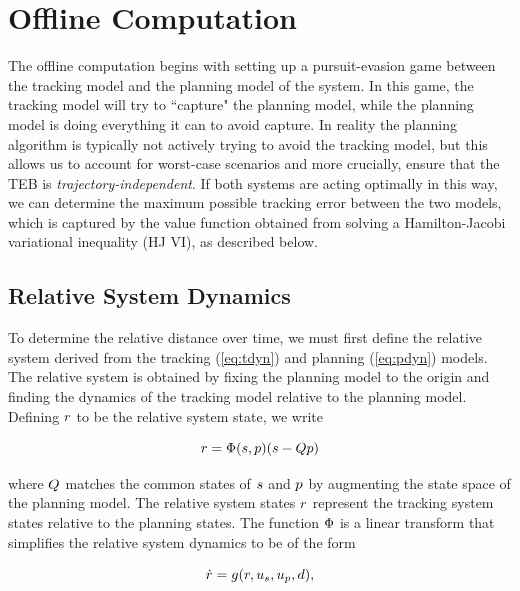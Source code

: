 \section{Offline Computation \label{sec:precomp}}
The offline computation begins with setting up a pursuit-evasion game \cite{Tomlin00,Mitchell05} between the tracking model and the planning model of the system. 
In this game, the tracking model will try to ``capture" the planning model, while the planning model is doing everything it can to avoid capture. 
In reality the planning algorithm is typically not actively trying to avoid the tracking model, but this allows us to account for worst-case scenarios and more crucially, ensure that the TEB is \textit{trajectory-independent}. 
If both systems are acting optimally in this way, we can determine the %
maximum possible tracking error between the two models, which is captured by the value function obtained from solving a Hamilton-Jacobi variational inequality (HJ VI), as described below.

\subsection{Relative System Dynamics}
To determine the relative distance over time, we must first define the relative system derived from the tracking (\ref{eq:tdyn}) and planning (\ref{eq:pdyn}) models. 
The relative system is obtained by fixing the planning model to the origin and finding the dynamics of the tracking model relative to the planning model.
Defining $r$ to be the relative system state, we write

\begin{equation}
\label{eq:rstate}
\rstate = \rtrans(\tstate,\pstate)(\tstate - \ptmat\pstate)
\end{equation}

\noindent where $Q$ matches the common states of $s$ and $p$ by augmenting the state space of the planning model.
The relative system states $r$ represent the tracking system states relative to the planning states.
The function $\Phi$ is a linear transform that simplifies the relative system dynamics to be of the form

\begin{equation}
\label{eq:rdyn}
\dot\rstate = \rdyn(\rstate, \tctrl, \pctrl, \dstb),
\end{equation}

